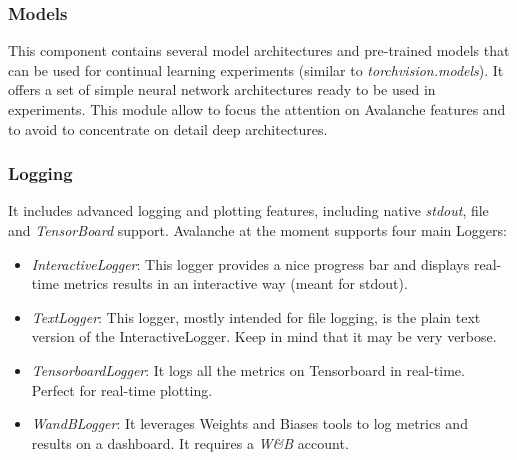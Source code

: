 \documentclass[english, LaM, oneside]{sapthesis}%
\begin{document}
\subsubsection{Models}
This component contains several model architectures and pre-trained models that can be used for continual learning experiments (similar to\textit{ torchvision.models}). It offers a set of simple neural network architectures ready to be used in experiments. This module allow to focus the attention on Avalanche features and to avoid to concentrate on detail deep architectures.

\subsubsection{Logging}
\textit{}It includes advanced logging and plotting features, including native \textit{stdout}, file and \textit{TensorBoard} support. Avalanche at the moment supports four main Loggers:
\begin{itemize}
    \item \textit{InteractiveLogger}: This logger provides a nice progress bar and displays real-time metrics results in an interactive way (meant for stdout).
    \item \textit{TextLogger}: This logger, mostly intended for file logging, is the plain text version of the InteractiveLogger. Keep in mind that it may be very verbose.
    \item \textit{TensorboardLogger}: It logs all the metrics on Tensorboard in real-time. Perfect for real-time plotting.
    \item \textit{WandBLogger}: It leverages Weights and Biases tools to log metrics and results on a dashboard. It requires a\textit{ W&B} account.
\end{itemize}
\end{document}
